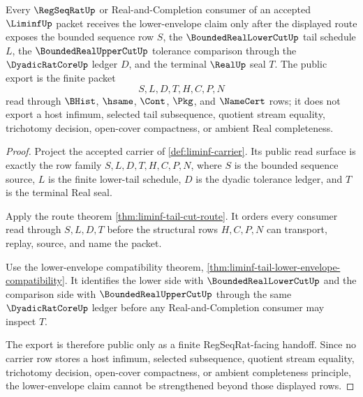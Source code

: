 \begin{theorem}
\label{thm:liminf-regseqrat-lower-cut-public-export}
Every $\RegSeqRatUp$ or Real-and-Completion consumer of an accepted $\LiminfUp$ packet receives the lower-envelope claim only after the displayed route exposes the bounded sequence row $S$, the $\BoundedRealLowerCutUp$ tail schedule $L$, the $\BoundedRealUpperCutUp$ tolerance comparison through the $\DyadicRatCoreUp$ ledger $D$, and the terminal $\RealUp$ seal $T$. The public export is the finite packet
$$
S,L,D,T,H,C,P,N
$$
read through $\BHist$, $\hsame$, $\Cont$, $\Pkg$, and $\NameCert$ rows; it does not export a host infimum, selected tail subsequence, quotient stream equality, trichotomy decision, open-cover compactness, or ambient Real completeness.
\end{theorem}
\begin{proof}
Project the accepted carrier of \autoref{def:liminf-carrier}. Its public read surface is exactly the row family $S,L,D,T,H,C,P,N$, where $S$ is the bounded sequence source, $L$ is the finite lower-tail schedule, $D$ is the dyadic tolerance ledger, and $T$ is the terminal Real seal.

Apply the route theorem \autoref{thm:liminf-tail-cut-route}. It orders every consumer read through $S,L,D,T$ before the structural rows $H,C,P,N$ can transport, replay, source, and name the packet.

Use the lower-envelope compatibility theorem, \autoref{thm:liminf-tail-lower-envelope-compatibility}. It identifies the lower side with $\BoundedRealLowerCutUp$ and the comparison side with $\BoundedRealUpperCutUp$ through the same $\DyadicRatCoreUp$ ledger before any Real-and-Completion consumer may inspect $T$.

The export is therefore public only as a finite RegSeqRat-facing handoff. Since no carrier row stores a host infimum, selected subsequence, quotient stream equality, trichotomy decision, open-cover compactness, or ambient completeness principle, the lower-envelope claim cannot be strengthened beyond those displayed rows.
\end{proof}

